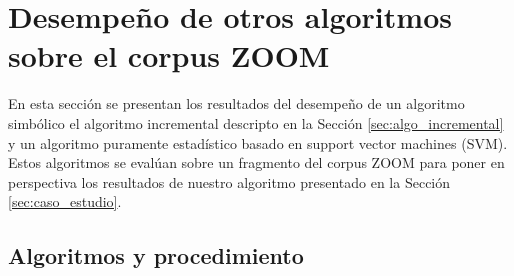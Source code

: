 \section{Desempe\~no de otros algoritmos sobre el corpus ZOOM}
\label{corpus-evaluacion}

En esta secci\'on se presentan los resultados del desempe\~no de un algoritmo simb\'olico el algoritmo incremental descripto en la Secci\'on \ref{sec:algo_incremental} y un algoritmo puramente estad\'istico basado en support vector machines (SVM). Estos algoritmos se eval\'uan sobre un fragmento del corpus ZOOM para poner en perspectiva los resultados de nuestro algoritmo presentado en la Secci\'on \ref{sec:caso_estudio}.
\subsection{Algoritmos y procedimiento}



